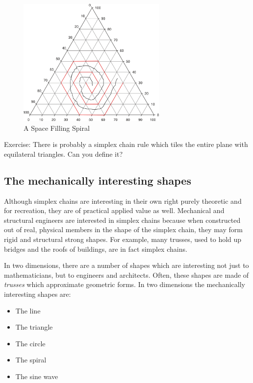 \documentclass[11pt]{article}
\begin{document}
\begin{figure}
     \centering
     \includegraphics[width=0.65\textwidth]{figures/2DSpaceFilling.png}
     \caption{A Space Filling Spiral}
  \label{fig:equitetrabeam}
\end{figure}


Exercise: There is probably a simplex chain rule which tiles the entire plane with equilateral triangles. Can you define it?

\subsection{The mechanically interesting shapes}

Although simplex chains are interesting in their own right purely theoretic and for recreation,
they are of practical applied value as well.
Mechanical and structural engineers are interested in simplex chains because when constructed out of real, physical
members in the shape of the simplex chain, they may form rigid and structural strong shapes.
For example, many trusses, used to hold up bridges and the roofs of buildings, are in fact simplex chains.

In two dimensions, there are a number of shapes which are interesting not just to mathematicians, but
to engineers and architects. Often, these shapes are made of {\em trusses} which approximate
geometric forms.
In two dimensions the mechanically interesting shapes are:
\begin{itemize}
\item The line
\item The triangle
\item The circle
\item The spiral
\item The sine wave
\end{itemize}
\end{document}
